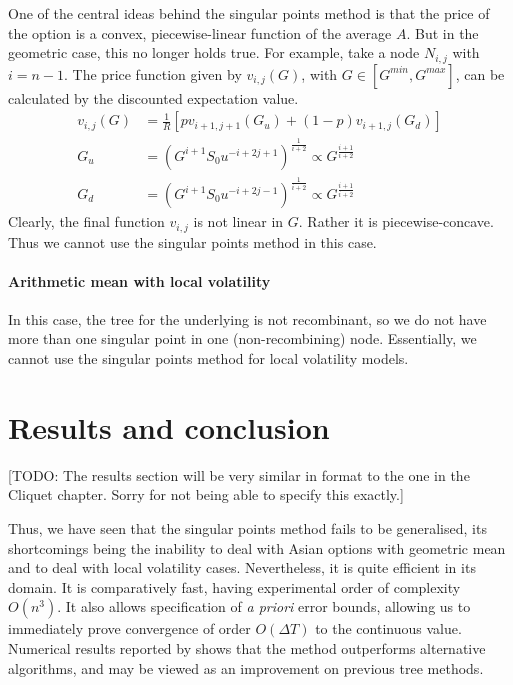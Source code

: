 One of the central ideas behind the singular points method is that the price of the option is a convex, piecewise-linear function of the average $A$. But in the geometric case, this no longer holds true. For example, take a node $N_{i,j}$ with $ i = n-1 $. The price function given by $ v_{i,j}(G) $, with $ G \in [G^{min},G^{max}] $, can be calculated by the discounted expectation value.
\begin{align}
	v_{i,j}(G) &= \frac{1}{R} \left[ p v_{i+1,j+1}(G_u) + (1-p) v_{i+1,j}(G_d) \right] \\
	G_u &= \left( G^{i+1} S_0 u^{-i+2j+1} \right)^{\frac{1}{i+2}} \propto G^{\frac{i+1}{i+2}} \\
	G_d &= \left( G^{i+1} S_0 u^{-i+2j-1} \right)^{\frac{1}{i+2}} \propto G^{\frac{i+1}{i+2}}
\end{align}
Clearly, the final function $ v_{i,j} $ is not linear in $G$. Rather it is piecewise-concave. Thus we cannot use the singular points method in this case.


\paragraph{Arithmetic mean with local volatility}
In this case, the tree for the underlying is not recombinant, so we do not have more than one singular point in one (non-recombining) node. Essentially, we cannot use the singular points method for local volatility models.



\section{Results and conclusion}
\label{sec:asian-results}

[TODO: The results section will be very similar in format to the one in the Cliquet chapter. Sorry for not being able to specify this exactly.]


Thus, we have seen that the singular points method fails to be generalised, its shortcomings being the inability to deal with Asian options with geometric mean and to deal with local volatility cases. Nevertheless, it is quite efficient in its domain. It is comparatively fast, having experimental order of complexity $ O(n^3) $. It also allows specification of \emph{a priori} error bounds, allowing us to immediately prove convergence of order $ O(\Delta T) $ to the continuous value. Numerical results reported by \cite{Gaudenzi2010} shows that the method outperforms alternative algorithms, and may be viewed as an improvement on previous tree methods.


